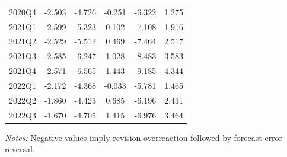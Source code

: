 \begin{table}[!htbp]
\begin{threeparttable}
\begin{tabular}{lccccc}
2020Q4 & -2.503 & -4.726 & -0.251 & -6.322 & 1.275 \\
2021Q1 & -2.599 & -5.323 & 0.102 & -7.108 & 1.916 \\
2021Q2 & -2.529 & -5.512 & 0.469 & -7.464 & 2.517 \\
2021Q3 & -2.585 & -6.247 & 1.028 & -8.483 & 3.583 \\
2021Q4 & -2.571 & -6.565 & 1.443 & -9.185 & 4.344 \\
2022Q1 & -2.172 & -4.368 & -0.033 & -5.781 & 1.465 \\
2022Q2 & -1.860 & -4.423 & 0.685 & -6.196 & 2.431 \\
2022Q3 & -1.670 & -4.705 & 1.415 & -6.976 & 3.464 \\
\bottomrule
\end{tabular}
\begin{tablenotes}[flushleft]
\footnotesize
\item \textit{Notes:} Negative values imply revision overreaction followed by forecast-error reversal.
\end{tablenotes}
\end{threeparttable}
\end{table}
